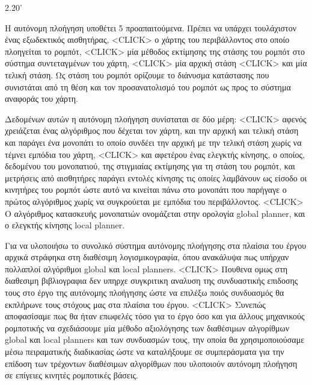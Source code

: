 \documentclass[a4paper,10pt]{article}
\begin{document}
2.20'


Η αυτόνομη πλοήγηση υποθέτει 5 προαπαιτούμενα. Πρέπει να υπάρχει τουλάχιστον
ένας εξωδεκτικός αισθητήρας,
<CLICK>
ο χάρτης του περιβάλλοντος στο οποίο πλοηγείται το ρομπότ,
<CLICK>
μία μέθοδος εκτίμησης της στάσης του ρομπότ στο σύστημα συντεταγμένων
του χάρτη,
<CLICK>
μία αρχική στάση
<CLICK>
και μία τελική στάση. Ως στάση του ρομπότ ορίζουμε το διάνυσμα κατάστασης που
συνιστάται από τη θέση και τον προσανατολισμό του ρομπότ ως προς το σύστημα
αναφοράς του χάρτη.



Δεδομένων αυτών η αυτόνομη πλοήγηση συνίσταται σε δύο μέρη:
<CLICK>
αφενός χρειάζεται ένας αλγόριθμος που δέχεται τον χάρτη, και την αρχική και
τελική στάση και παράγει ένα μονοπάτι το οποίο συνδέει την αρχική με την τελική
στάση χωρίς να τέμνει εμπόδια του χάρτη,
<CLICK>
και αφετέρου ένας ελεγκτής κίνησης, ο οποίος, δεδομένου του μονοπατιού, της
στιγμιαίας εκτίμησης για τη στάση του ρομπότ, και μετρήσεις από αισθητήρες
παράγει εντολές κίνησης τις οποίες λαμβάνουν ως είσοδο οι κινητήρες του ρομπότ
ώστε αυτό να κινείται πάνω στο μονοπάτι που παρήγαγε ο πρώτος αλγόριθμος χωρίς
να συγκρούεται με εμπόδια του περιβάλλοντος.
<CLICK>
Ο αλγόριθμος κατασκευής μονοπατιών ονομάζεται στην ορολογία global planner, και
ο ελεγκτής κίνησης local planner.

Για να υλοποιήσω το συνολικό σύστημα αυτόνομης πλοήγησης στα πλαίσια του έργου
αρχικά στράφηκα στη διαθέσιμη λογισμικογραφία, όπου ανακάλυψα πως υπήρχαν
πολλαπλοί αλγόριθμοι global και local planners.
<CLICK>
Πουθενα ομως στη διαθεσιμη
βιβλιογραφια δεν υπηρχε συγκριτικη αναλυση της συνδυαστικής επιδοσης τους στο
έργο της αυτόνομης πλοήγησης ώστε να επιλέξω ποιός συνδυασμός θα εκπλήρωνε τους
στόχους μας στα πλαίσια του έργου.
<CLICK>
Συνεπώς αποφασίσαμε πως θα ήταν επωφελές τόσο για το έργο όσο και για άλλους
μηχανικούς ρομποτικής να σχεδιάσουμε μία μέθοδο αξιολόγησης των διαθέσιμων
αλγορίθμων global και local planners και των συνδυασμών τους, την οποία θα
χρησιμοποιούσαμε μέσω πειραματικής διαδικασίας ώστε να καταλήξουμε σε
συμπεράσματα για την επίδοση των τρέχοντων διαθέσιμων αλγορίθμων που υλοποιούν
αυτόνομη πλοήγηση σε επίγειες κινητές ρομποτικές βάσεις.
\end{document}
